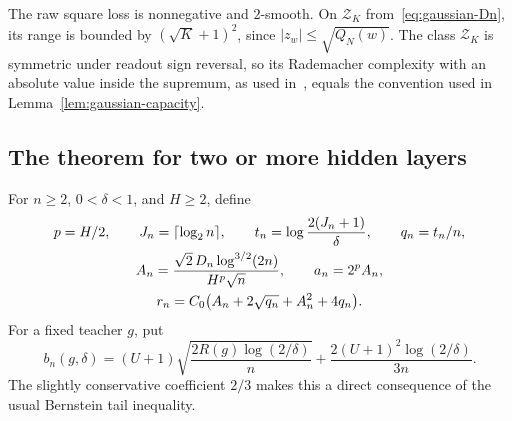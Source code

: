 The raw square loss is nonnegative and $2$-smooth.  On $\mathcal Z_K$
from~\eqref{eq:gaussian-Dn}, its range is bounded by
$(\sqrt K+1)^2$, since $|z_w|\leq\sqrt{Q_N(w)}$.
The class $\mathcal Z_K$ is symmetric under readout sign reversal, so
its Rademacher complexity with an absolute value inside the supremum,
as used in~\cite{sst}, equals the convention used in
Lemma~\ref{lem:gaussian-capacity}.

\subsection{The theorem for two or more hidden layers}

For $n\geq2$, $0<\delta<1$, and $H\geq2$, define
\begin{gather}
 p=H/2,\qquad J_n=\lceil\log_2 n\rceil,\qquad
 t_n=\log\frac{2(J_n+1)}\delta,\qquad q_n=t_n/n,\notag\\
 A_n=\frac{\sqrt2\,D_n\log^{3/2}(2n)}{H^p\sqrt n},\qquad
 a_n=2^p A_n,\notag\\
 r_n=C_0\bigl(A_n+2\sqrt{q_n}+A_n^2+4q_n\bigr).
 \label{eq:raw-constants}
\end{gather}
For a fixed teacher $g$, put
\begin{equation}
 b_n(g,\delta)
  =(U+1)\sqrt{\frac{2R(g)\log(2/\delta)}n}
     +\frac{2(U+1)^2\log(2/\delta)}{3n}.
 \label{eq:raw-teacher-concentration}
\end{equation}
The slightly conservative coefficient $2/3$ makes this a direct
consequence of the usual Bernstein tail inequality.

